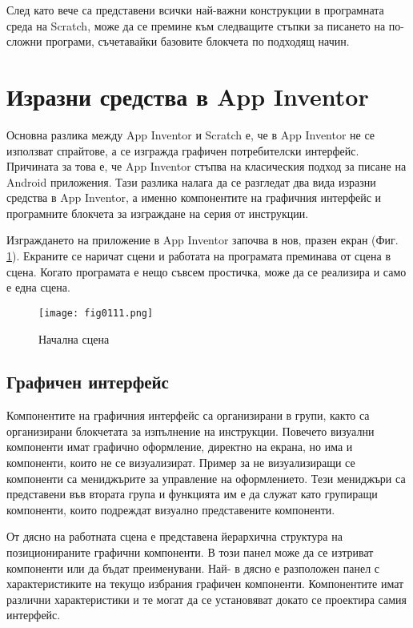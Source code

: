След като вече са представени всички най-важни конструкции в програмната среда на Scratch, може да се премине към следващите стъпки за писането на по-сложни програми, съчетавайки базовите блокчета по подходящ начин.

\section{Изразни средства в App Inventor}

Основна разлика между App Inventor и Scratch е, че в App Inventor не се използват спрайтове, а се изгражда графичен потребителски интерфейс. Причината за това е, че App Inventor стъпва на класическия подход за писане на Android приложения. Тази разлика налага да се разгледат два вида изразни средства в App Inventor, а именно компонентите на графичния интерфейс и програмните блокчета за изграждане на серия от инструкции.

Изграждането на приложение в App Inventor започва в нов, празен екран (Фиг. \ref{fig0111}). Екраните се наричат сцени и работата на програмата преминава от сцена в сцена. Когато програмата е нещо съвсем простичка, може да се реализира и само е една сцена. 

\begin{figure}[H]
  \centering
  \texttt{[image: fig0111.png]}
  \caption{Начална сцена}
\label{fig0111}
\end{figure}

\subsection{Графичен интерфейс}

Компонентите на графичния интерфейс са организирани в групи, както са организирани блокчетата за изпълнение на инструкции. Повечето визуални компоненти имат графично оформление, директно на екрана, но има и компоненти, които не се визуализират. Пример за не визуализиращи се компоненти са мениджърите за управление на оформлението. Тези мениджъри са представени във втората група и функцията им е да служат като групиращи компоненти, които подреждат визуално представените компоненти. 

От дясно на работната сцена е представена йерархична структура на позиционираните графични компоненти. В този панел може да се изтриват компоненти или да бъдат преименувани. Най- в дясно е разположен панел с характеристиките на текущо избрания графичен компоненти. Компонентите имат различни характеристики и те могат да се установяват докато се проектира самия интерфейс. 

